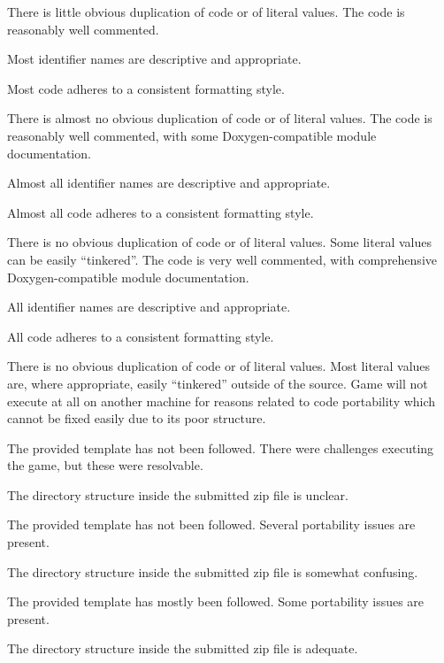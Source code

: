 \documentclass{../fal_assignment}
\begin{document}
\begin{markingrubric}
             \par There is little obvious duplication of code or of literal values.           
        \grade The code is reasonably well commented.
            \par Most identifier names are descriptive and appropriate.
            \par Most code adheres to a consistent formatting style.
             \par There is almost no obvious duplication of code or of literal values.   
        \grade The code is reasonably well commented, with some Doxygen-compatible module documentation.
            \par Almost all identifier names are descriptive and appropriate.
            \par Almost all code adheres to a consistent formatting style.
             \par There is no obvious duplication of code or of literal values. Some literal values can be easily ``tinkered''. 
        \grade The code is very well commented, with comprehensive Doxygen-compatible module documentation.
            \par All identifier names are descriptive and appropriate.
            \par All code adheres to a consistent formatting style.
             \par There is no obvious duplication of code or of literal values. Most literal values are, where appropriate, easily ``tinkered'' outside of the source.  
%
        \grade\fail Game will not execute at all on another machine for reasons related to code portability which cannot be fixed easily due to its poor structure.
            \par The provided template has not been followed.
        \grade There were challenges executing the game, but these were resolvable.
            \par The directory structure inside the submitted zip file is unclear.
            \par The provided template has not been followed.
        \grade Several portability issues are present.
            \par The directory structure inside the submitted zip file is somewhat confusing.
            \par The provided template has mostly been followed.
        \grade Some portability issues are present.
            \par The directory structure inside the submitted zip file is adequate.

\end{markingrubric}
\end{document}
